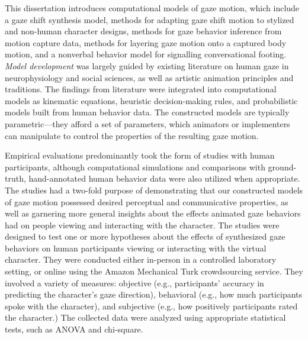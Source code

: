 This dissertation introduces computational models of gaze motion, which include a gaze shift synthesis model, methods for adapting gaze shift motion to stylized and non-human character designs, methods for gaze behavior inference from motion capture data, methods for layering gaze motion onto a captured body motion, and a nonverbal behavior model for signalling conversational footing. \emph{Model development} was largely guided by existing literature on human gaze in neurophysiology and social sciences, as well as artistic animation principles and traditions. The findings from literature were integrated into computational models as kinematic equations, heuristic decision-making rules, and probabilistic models built from human behavior data. The constructed models are typically parametric---they afford a set of parameters, which animators or implementers can manipulate to control the properties of the resulting gaze motion.

Empirical evaluations predominantly took the form of studies with human participants, although computational simulations and comparisons with ground-truth, hand-annotated human behavior data were also utilized when appropriate. The studies had a two-fold purpose of demonstrating that our constructed models of gaze motion possessed desired perceptual and communicative properties, as well as garnering more general insights about the effects animated gaze behaviors had on people viewing and interacting with the character. The studies were designed to test one or more hypotheses about the effects of synthesized gaze behaviors on human participants viewing or interacting with the virtual character. They were conducted either in-person in a controlled laboratory setting, or online using the Amazon Mechanical Turk crowdsourcing service. They involved a variety of measures: objective (e.g., participants' accuracy in predicting the character's gaze direction), behavioral (e.g., how much participants spoke with the character), and subjective (e.g., how positively participants rated the character.) The collected data were analyzed using appropriate statistical tests, such as ANOVA and chi-square.

